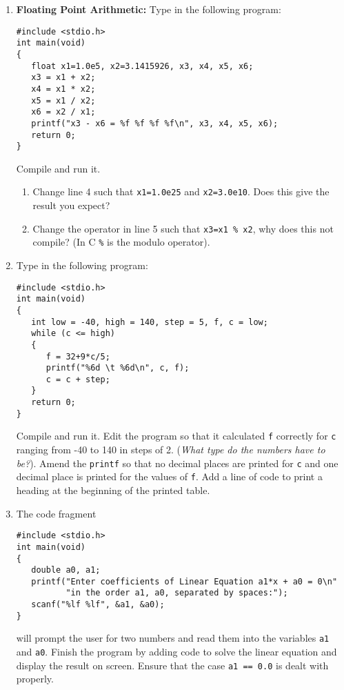 \documentclass[a4paper,12pt]{article}
\begin{document}
\begin{enumerate}
\item {\bf Floating Point Arithmetic:} Type in the following program:
\begin{verbatim}
#include <stdio.h>
int main(void)
{
   float x1=1.0e5, x2=3.1415926, x3, x4, x5, x6;
   x3 = x1 + x2;
   x4 = x1 * x2;
   x5 = x1 / x2;
   x6 = x2 / x1;
   printf("x3 - x6 = %f %f %f %f\n", x3, x4, x5, x6);
   return 0;
}
\end{verbatim}
Compile and run it.
\begin{enumerate}
\item Change line 4 such that \verb|x1=1.0e25| and \verb|x2=3.0e10|. Does this give the result you expect?
\item Change the operator in line 5 such that \verb|x3=x1 % x2|, why does this not compile? (In C \verb|%| is the modulo operator).
\end{enumerate}

\item Type in the following program:
\begin{verbatim}
#include <stdio.h>
int main(void)
{
   int low = -40, high = 140, step = 5, f, c = low;
   while (c <= high)
   {
      f = 32+9*c/5;
      printf("%6d \t %6d\n", c, f);
      c = c + step;
   }
   return 0;
}
\end{verbatim}
Compile and run it. Edit the program so that it calculated {\tt f} correctly for {\tt c} ranging from -40 to 140 in steps of 2. (\emph{What type do the numbers have to be?}). Amend the {\tt printf} so that no decimal places are printed for {\tt c} and one decimal place is printed for the values of {\tt f}. Add a line of code to print a heading at the beginning of the printed table.

\item The code fragment
\begin{verbatim}
#include <stdio.h>
int main(void)
{
   double a0, a1;
   printf("Enter coefficients of Linear Equation a1*x + a0 = 0\n"
          "in the order a1, a0, separated by spaces:");
   scanf("%lf %lf", &a1, &a0);
}
\end{verbatim}
will prompt the user for two numbers and read them into the variables {\tt a1} and {\tt a0}. Finish the program by adding code to solve the linear equation and display the result on screen. Ensure that the case {\tt a1 == 0.0} is dealt with properly.
\end{enumerate}
\end{document}
